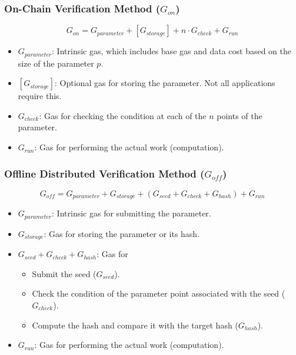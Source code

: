 \documentclass[runningheads]{llncs}
\begin{document}
\subsubsection{On-Chain Verification Method (\( G_{on} \))}

\begin{equation}
G_{on} = G_{parameter} + [G_{storage}] + n \cdot G_{check} + G_{run}
\end{equation}

\begin{itemize}
    \item \( G_{parameter} \): Intrinsic gas, which includes base gas and data cost based on the size of the parameter \( p \).
    \item \( [G_{storage}] \): Optional gas for storing the parameter. Not all applications require this.
    \item \( G_{check} \): Gas for checking the condition at each of the \( n \) points of the parameter.
    \item \( G_{run} \): Gas for performing the actual work (computation).
\end{itemize}

\subsubsection{Offline Distributed Verification Method (\( G_{off} \))}

\begin{equation}
G_{off} = G_{parameter} + G_{storage} +   (G_{seed} + G_{check} + G_{hash}) + G_{run}
\end{equation}

\begin{itemize}
    \item \( G_{parameter} \): Intrinsic gas for submitting the parameter.
    \item \( G_{storage} \): Gas for storing the parameter or its hash.
    \item \( G_{seed} + G_{check} + G_{hash} \): Gas for 
    \begin{itemize}
        \item Submit the seed (\( G_{seed} \)).
        \item Check the condition of the parameter point associated with the seed (\( G_{check} \)).
        \item Compute the hash and compare it with the target hash (\( G_{hash} \)).
    \end{itemize}
    \item \( G_{run} \): Gas for performing the actual work (computation).
\end{itemize}
\end{document}
